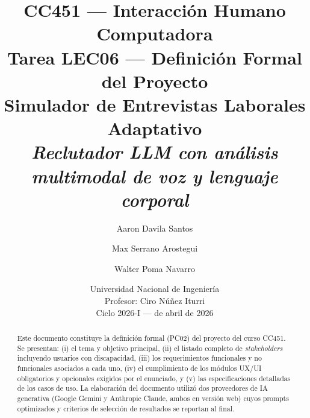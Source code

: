 \documentclass[11pt,a4paper]{article}
\title{%
  \vspace{-1.5cm}
  \large CC451 --- Interacción Humano Computadora \\[0.3cm]
  \Large Tarea LEC06 --- Definición Formal del Proyecto \\[0.5cm]
  \LARGE\bfseries Simulador de Entrevistas Laborales Adaptativo \\[0.3cm]
  \large \textit{Reclutador LLM con análisis multimodal de voz y lenguaje corporal}
}
\author{%
  Aaron Davila Santos \and
  Max Serrano Arostegui \and
  Walter Poma Navarro
}
\date{Universidad Nacional de Ingeniería \\
      Profesor: Ciro Núñez Iturri \\
      Ciclo 2026-I \quad --- \quad 29 de abril de 2026}
\begin{document}
\maketitle
\thispagestyle{empty}

\begin{abstract}
\noindent Este documento constituye la definición formal (PC02) del proyecto del curso CC451.
Se presentan: (i) el tema y objetivo principal, (ii) el listado completo de
\textit{stakeholders} incluyendo usuarios con discapacidad, (iii) los requerimientos
funcionales y no funcionales asociados a cada uno, (iv) el cumplimiento de los
módulos UX/UI obligatorios y opcionales exigidos por el enunciado, y (v) las
especificaciones detalladas de los casos de uso. La elaboración del documento
utilizó dos proveedores de IA generativa (Google Gemini y Anthropic Claude,
ambos en versión web) cuyos prompts optimizados y criterios de selección de
resultados se reportan al final.
\end{abstract}

\tableofcontents
\newpage














\end{document}
